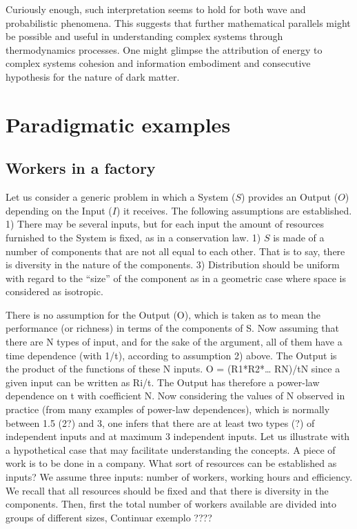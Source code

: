 \documentclass[a4paper, 11pt]{article} %
\begin{document}
Curiously enough, such interpretation seems to hold for 
both wave and probabilistic phenomena.
This suggests that further mathematical
parallels might be possible and useful in understanding complex
systems through thermodynamics processes.
One might glimpse the attribution of energy to complex systems
cohesion and information embodiment and consecutive 
hypothesis for the nature of dark matter.

\section{Paradigmatic examples}
\subsection{Workers in a factory}
Let us consider a generic problem in which a System ($S$) provides an Output ($O$) depending on the Input ($I$) it receives. The following assumptions are established.
1) There may be several inputs, but for each input the amount of resources furnished to the System is fixed, as in a conservation law. 
1) $S$ is made of a number of components that are not all equal to each other. That is to say, there is diversity in the nature of the components. 
3) Distribution should be uniform with regard to the “size” of the component as in a geometric case where space is considered as isotropic. 

There is no assumption for the Output (O), which is taken as to mean the performance (or richness) in terms of the components of S. 
Now assuming that there are N types of input, and for the sake of the argument, all of them have a time dependence (with 1/t), according to assumption 2) above. The Output is the product of the functions of these N inputs. 
O = (R1*R2*… RN)/tN since a given input can be written as Ri/t. 
The Output has therefore a power-law dependence on t with coefficient N. 
Now considering the values of N observed in practice (from many examples of power-law dependences), which is normally between 1.5 (2?) and 3, one infers that there are at least two types (?) of independent inputs and at maximum 3 independent inputs. 
Let us illustrate with a hypothetical case that may facilitate understanding the concepts. A piece of work is to be done in a company. What sort of resources can be established as inputs? We assume three inputs: number of workers, working hours and efficiency. We recall that all resources should be fixed and that there is diversity in the components. 
Then, first the total number of workers available are divided into groups of different sizes,
Continuar exemplo ????
\end{document}

